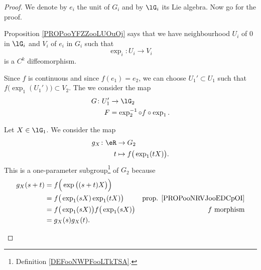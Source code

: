 \begin{proof}
	We denote by \( e_i\) the unit of \( G_i\) and by \( \lG_i\) its Lie algebra. Now go for the proof.
	\begin{subproof}
		Proposition \ref{PROPooYFZZooLUOuOj} says that we have neighbourhood \( U_i\) of \( 0\) in \( \lG_i\) and \( V_i\) of \( e_i\) in \( G_i\) such that
		\begin{equation}
			\exp_i \colon U_i\to V_i
		\end{equation}
		is a \( C^k\) diffeomorphism.

		Since \( f\) is continuous and since \( f(e_1)=e_2\), we can choose \( U_1'\subset U_1\) such that \( f\big( \exp_1(U_1') \big)\subset V_2\). The we consider the map
		\begin{equation}
			\begin{aligned}
				G\colon U_1' & \to \lG_2                        \\
				F            & =\exp_2^{-1}\circ f\circ \exp_1.
			\end{aligned}
		\end{equation}

		Let \( X\in \lG_1\). We consider the map
		\begin{equation}
			\begin{aligned}
				g_X\colon \eR & \to G_2                          \\
				t             & \mapsto f\big( \exp_1(tX) \big).
			\end{aligned}
		\end{equation}
		This is a one-parameter subgroup\footnote{Definition \ref{DEFooNWPFooLTkTSA}.} of \( G_2\) because
		\begin{subequations}
			\begin{align}
				g_X(s+t) & =f\Big( \exp\big( (s+t)X \big) \Big)                                                    \\
				         & =f\big( \exp_1(sX)\exp_1(tX) \big)              & \text{prop. \ref{PROPooNRVJooEDCpOI}} \\
				         & =f\big( \exp_1(sX) \big)f\big( \exp_1(sX) \big) & \text{\( f\) morphism}                \\
				         & =g_X(s)g_X(t).
			\end{align}
		\end{subequations}


\end{subproof}
\end{proof}
